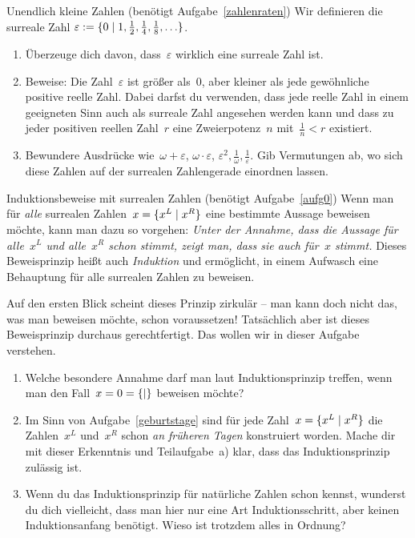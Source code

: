 \documentclass{zirkelblatt}
\begin{document}
\begin{aufgabe}{Unendlich kleine Zahlen (benötigt Aufgabe~\ref{zahlenraten})}
\label{infinitesimal}
Wir definieren die surreale Zahl
$\varepsilon := \{ 0 \mathrel{|} 1, \tfrac{1}{2}, \tfrac{1}{4}, \tfrac{1}{8}, \ldots \}$.
\begin{enumerate}
\item Überzeuge dich davon, dass~$\varepsilon$ wirklich eine surreale Zahl ist.
\item Beweise: Die Zahl~$\varepsilon$ ist größer als~$0$, aber kleiner als jede
gewöhnliche positive reelle Zahl. Dabei darfst du verwenden, dass jede reelle
Zahl in einem geeigneten Sinn auch als surreale Zahl angesehen werden kann und
dass zu jeder positiven reellen Zahl~$r$ eine Zweierpotenz~$n$
mit~$\tfrac{1}{n} < r$ existiert.
\item Bewundere Ausdrücke wie~$\omega + \varepsilon$, $\omega \cdot
\varepsilon$, $\varepsilon^2, \tfrac{1}{\omega}, \tfrac{1}{\varepsilon}$. Gib
Vermutungen ab, wo sich diese Zahlen auf der
surrealen Zahlengerade einordnen lassen.
\end{enumerate}
\end{aufgabe}

\begin{aufgabe}{Induktionsbeweise mit surrealen Zahlen (benötigt Aufgabe~\ref{aufg0})}
\label{induktionsbeweise}
Wenn man für \emph{alle} surrealen Zahlen~$x = \{ x^L \mathrel{|} x^R \}$ eine bestimmte Aussage
beweisen möchte, kann man dazu so vorgehen: \emph{Unter der Annahme, dass die Aussage für
alle~$x^L$ und alle~$x^R$ schon stimmt, zeigt man, dass sie auch für~$x$
stimmt.} Dieses Beweisprinzip heißt auch \emph{Induktion} und ermöglicht, in
einem Aufwasch eine Behauptung für alle surrealen Zahlen zu beweisen.

Auf den ersten Blick scheint dieses Prinzip zirkulär -- man kann doch nicht das,
was man beweisen möchte, schon voraussetzen! Tatsächlich aber ist dieses
Beweisprinzip durchaus gerechtfertigt. Das wollen wir in dieser Aufgabe verstehen.
\begin{enumerate}
\item Welche besondere Annahme darf man laut Induktionsprinzip treffen, wenn
man den Fall~$x = 0 = \{  \mathrel{|}  \}$ beweisen möchte?
\item Im Sinn von Aufgabe~\ref{geburtstage} sind für jede Zahl~$x =
\{ x^L \mathrel{|} x^R \}$ die Zahlen~$x^L$ und~$x^R$
schon \emph{an früheren Tagen} konstruiert worden. Mache dir mit dieser Erkenntnis
und Teilaufgabe~a) klar, dass das Induktionsprinzip zulässig ist.
\item Wenn du das Induktionsprinzip für natürliche Zahlen schon kennst,
wunderst du dich vielleicht, dass man hier nur eine Art Induktionsschritt, aber
keinen Induktionsanfang benötigt. Wieso ist trotzdem alles in Ordnung?
\end{enumerate}
\end{aufgabe}
\end{document}
